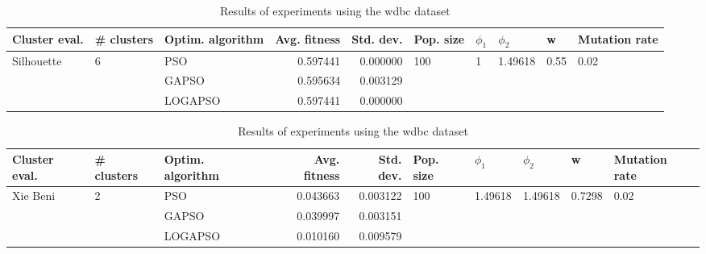 \documentclass{article}
\begin{document}
\begin{table}
\centering
\caption{Results of experiments using the wdbc dataset}
\begin{tabular}{lllrrlllll}
\toprule
              Cluster eval. &        \# clusters & Optim. algorithm &  Avg. fitness &  Std. dev. &            Pop. size &         $\phi_{1}$ &               $\phi_{2}$ &                     w &         Mutation rate \\
\midrule
\multirow{3}{*}{Silhouette} & \multirow{3}{*}{6} &              PSO &      0.597441 &   0.000000 & \multirow{3}{*}{100} & \multirow{3}{*}{1} & \multirow{3}{*}{1.49618} & \multirow{3}{*}{0.55} & \multirow{3}{*}{0.02} \\
                            &                    &            GAPSO &      0.595634 &   0.003129 &                      &                    &                          &                       &                       \\
                            &                    &          LOGAPSO &      0.597441 &   0.000000 &                      &                    &                          &                       &                       \\
\bottomrule
\end{tabular}
\end{table}
\begin{table}
\centering
\caption{Results of experiments using the wdbc dataset}
\begin{tabular}{lllrrlllll}
\toprule
            Cluster eval. &        \# clusters & Optim. algorithm &  Avg. fitness &  Std. dev. &            Pop. size &               $\phi_{1}$ &               $\phi_{2}$ &                       w &         Mutation rate \\
\midrule
\multirow{3}{*}{Xie Beni} & \multirow{3}{*}{2} &              PSO &      0.043663 &   0.003122 & \multirow{3}{*}{100} & \multirow{3}{*}{1.49618} & \multirow{3}{*}{1.49618} & \multirow{3}{*}{0.7298} & \multirow{3}{*}{0.02} \\
                          &                    &            GAPSO &      0.039997 &   0.003151 &                      &                          &                          &                         &                       \\
                          &                    &          LOGAPSO &      0.010160 &   0.009579 &                      &                          &                          &                         &                       \\
\bottomrule
\end{tabular}
\end{table}
\end{document}
